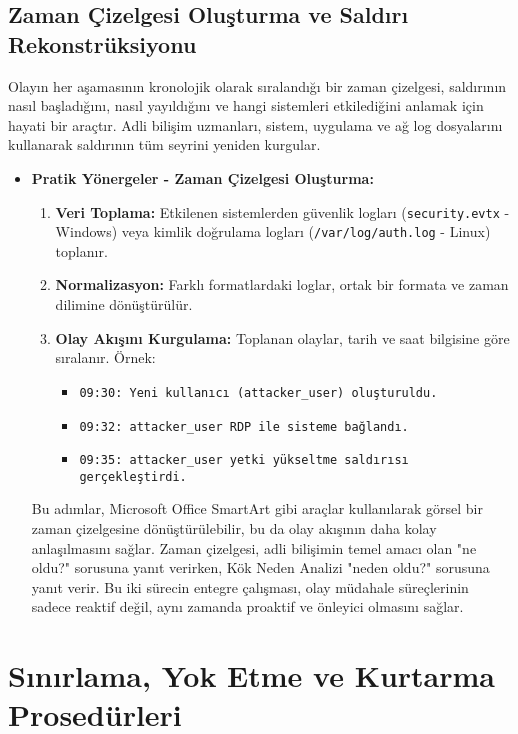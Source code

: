 \subsection{Zaman Çizelgesi Oluşturma ve Saldırı Rekonstrüksiyonu}

Olayın her aşamasının kronolojik olarak sıralandığı bir zaman çizelgesi, saldırının nasıl başladığını, nasıl yayıldığını ve hangi sistemleri etkilediğini anlamak için hayati bir araçtır. Adli bilişim uzmanları, sistem, uygulama ve ağ log dosyalarını kullanarak saldırının tüm seyrini yeniden kurgular.

\begin{itemize}
    \item \textbf{Pratik Yönergeler - Zaman Çizelgesi Oluşturma:}
    \begin{enumerate}
        \item \textbf{Veri Toplama:} Etkilenen sistemlerden güvenlik logları (\texttt{security.evtx} - Windows) veya kimlik doğrulama logları (\texttt{/var/log/auth.log} - Linux) toplanır.
        \item \textbf{Normalizasyon:} Farklı formatlardaki loglar, ortak bir formata ve zaman dilimine dönüştürülür.
        \item \textbf{Olay Akışını Kurgulama:} Toplanan olaylar, tarih ve saat bilgisine göre sıralanır. Örnek:
        \begin{itemize}
            \item \texttt{09:30: Yeni kullanıcı (attacker\_user) oluşturuldu.}
            \item \texttt{09:32: attacker\_user RDP ile sisteme bağlandı.}
            \item \texttt{09:35: attacker\_user yetki yükseltme saldırısı gerçekleştirdi.}
        \end{itemize}
    \end{enumerate}
    Bu adımlar, Microsoft Office SmartArt gibi araçlar kullanılarak görsel bir zaman çizelgesine dönüştürülebilir, bu da olay akışının daha kolay anlaşılmasını sağlar. Zaman çizelgesi, adli bilişimin temel amacı olan "ne oldu?" sorusuna yanıt verirken, Kök Neden Analizi "neden oldu?" sorusuna yanıt verir. Bu iki sürecin entegre çalışması, olay müdahale süreçlerinin sadece reaktif değil, aynı zamanda proaktif ve önleyici olmasını sağlar.
\end{itemize}

\section{Sınırlama, Yok Etme ve Kurtarma Prosedürleri}

